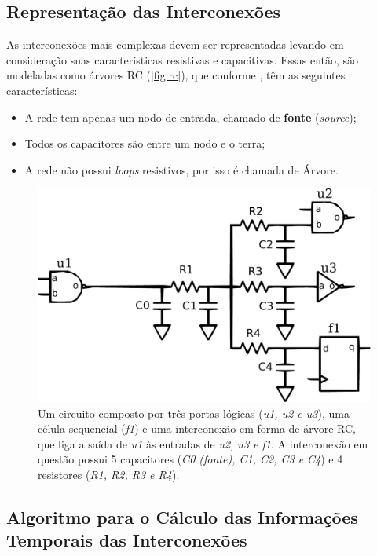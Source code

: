 \documentclass[
	12pt,				%
	openright,			%
	twoside,			%
	a4paper,			%
	english,			%
	french,				%
	spanish,			%
	brazil,				%
	]{abntex2}
\begin{document}
\subsection{Representação das Interconexões}
As interconexões mais complexas devem ser representadas levando em consideração suas características resistivas e capacitivas. Essas então, são modeladas como árvores RC (\autoref{fig:rc}), que conforme , têm as seguintes características: 

\begin{itemize}
\item A rede tem apenas um nodo de entrada, chamado de \textbf{fonte} (\textit{source});
\item Todos os capacitores são entre um nodo e o terra;
\item A rede não possui \textit{loops} resistivos, por isso é chamada de Árvore.
\end{itemize}

\begin{figure}[ht]
\begin{center}
\caption{\label{fig:rc}Um circuito composto por três portas lógicas (\textit{u1, u2 e u3}), uma célula sequencial (\textit{f1}) e uma interconexão em forma de árvore RC, que liga a saída de \textit{u1} às entradas de \textit{u2, u3 e f1}. A interconexão em questão possui 5 capacitores (\textit{C0 (fonte), C1, C2, C3 e C4}) e 4 resistores (\textit{R1, R2, R3 e R4}).}
\includegraphics[width=0.7 \linewidth]{img/rc.pdf} 
\end{center}
\end{figure}

\subsection{Algoritmo para o Cálculo das Informações Temporais das Interconexões}
\end{document}
